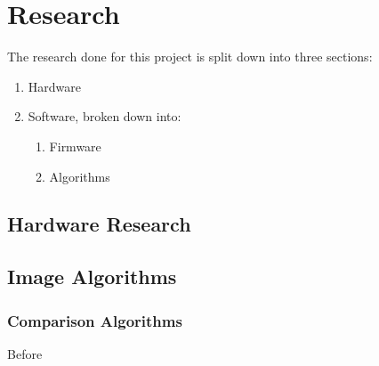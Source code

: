 \chapter{Research} \label{Chapter:Research}
The research done for this project is split down into three sections:
\begin{enumerate}
\item Hardware
\item Software, broken down into:
\begin{enumerate}
\item Firmware
\item Algorithms
\end{enumerate}
\end{enumerate}

\section{Hardware Research}


\section{Image Algorithms}

\subsection{Comparison Algorithms} 
Before 


